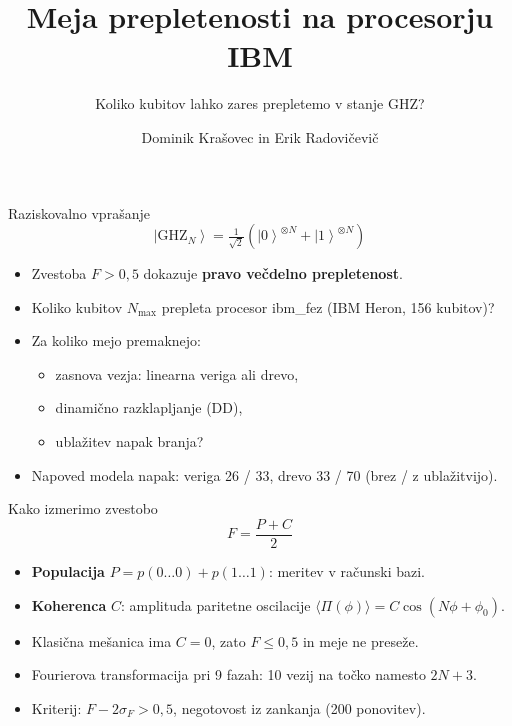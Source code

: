 \documentclass[aspectratio=169,11pt]{beamer}
\title{Meja prepletenosti na procesorju IBM}
\subtitle{Koliko kubitov lahko zares prepletemo v stanje GHZ?}
\author{Dominik Krašovec in Erik Radovičevič}
\institute{Skupina 20, NPMP 2026/27}
\date{}
\newcommand{\ket}[1]{\left|#1\right\rangle}
\begin{document}
\begin{frame}
\titlepage
\end{frame}

\begin{frame}{Raziskovalno vprašanje}
\[
\ket{\mathrm{GHZ}_N} = \tfrac{1}{\sqrt{2}}\left(\ket{0}^{\otimes N} + \ket{1}^{\otimes N}\right)
\]
\begin{itemize}
\item Zvestoba $F>0{,}5$ dokazuje \textbf{pravo večdelno prepletenost}.
\item Koliko kubitov $N_{\max}$ prepleta procesor ibm\_fez (IBM Heron, 156 kubitov)?
\item Za koliko mejo premaknejo:
  \begin{itemize}
  \item zasnova vezja: linearna veriga ali drevo,
  \item dinamično razklapljanje (DD),
  \item ublažitev napak branja?
  \end{itemize}
\item Napoved modela napak: veriga 26 / 33, drevo 33 / 70 (brez / z ublažitvijo).
\end{itemize}
\end{frame}

\begin{frame}{Kako izmerimo zvestobo}
\[
F = \frac{P + C}{2}
\]
\begin{itemize}
\item \textbf{Populacija} $P=p(0\dots0)+p(1\dots1)$: meritev v računski bazi.
\item \textbf{Koherenca} $C$: amplituda paritetne oscilacije $\langle\Pi(\phi)\rangle = C\cos(N\phi+\phi_0)$.
\item Klasična mešanica ima $C=0$, zato $F\le 0{,}5$ in meje ne preseže.
\item Fourierova transformacija pri 9 fazah: 10 vezij na točko namesto $2N+3$.
\item Kriterij: $F-2\sigma_F>0{,}5$, negotovost iz zankanja (200 ponovitev).
\end{itemize}
\end{frame}
\end{document}
